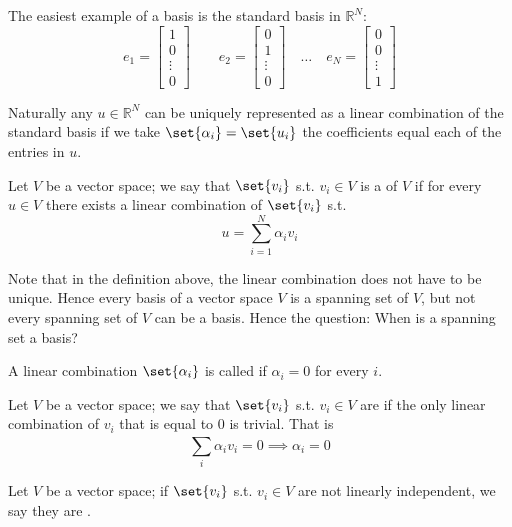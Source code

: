 \documentclass{article}
\begin{document}
The easiest example of a basis is the standard basis in $\mathbb{R}^N$:
\[
  e_1 = \left[\begin{matrix}
    1 \\ 0 \\ \vdots \\ 0
  \end{matrix}\right]
  \quad\quad
  e_2 = \left[\begin{matrix}
    0 \\ 1 \\ \vdots \\ 0
  \end{matrix}\right]
  \quad\ldots\quad
  e_N = \left[\begin{matrix}
    0 \\ 0 \\ \vdots \\ 1
  \end{matrix}\right]
\]

Naturally any $u \in \mathbb{R}^N$ can be uniquely represented as a linear combination of the standard basis if we take $\set{\alpha_i} = \set{u_i}$ the coefficients equal each of the entries in $u$.

\begin{definition}
  Let $V$ be a vector space; we say that $\set{v_i}$ s.t. $v_i \in V$ is a  of $V$ if for every $u \in V$ there exists a linear combination of $\set{v_i}$ s.t.
  \[
    u = \sum^{N}_{i = 1} \alpha_i v_i
  \]
\end{definition}

Note that in the definition above, the linear combination does not have to be unique. Hence every basis of a vector space $V$ is a spanning set of $V$, but not every spanning set of $V$ can be a basis. Hence the question: When is a spanning set a basis?

\begin{definition}
  A linear combination $\set{\alpha_i}$ is called  if $\alpha_i = 0$ for every $i$.
\end{definition}

\begin{definition}
  Let $V$ be a vector space; we say that $\set{v_i}$ s.t. $v_i \in V$ are  if the only linear combination of $v_i$ that is equal to $0$ is trivial. That is
  \[
    \sum^{}_{i} \alpha_i v_i = 0 \implies \alpha_i = 0
  \]
\end{definition}

\begin{definition}
  Let $V$ be a vector space; if $\set{v_i}$ s.t. $v_i \in V$ are not linearly independent, we say they are .
\end{definition}
\end{document}
